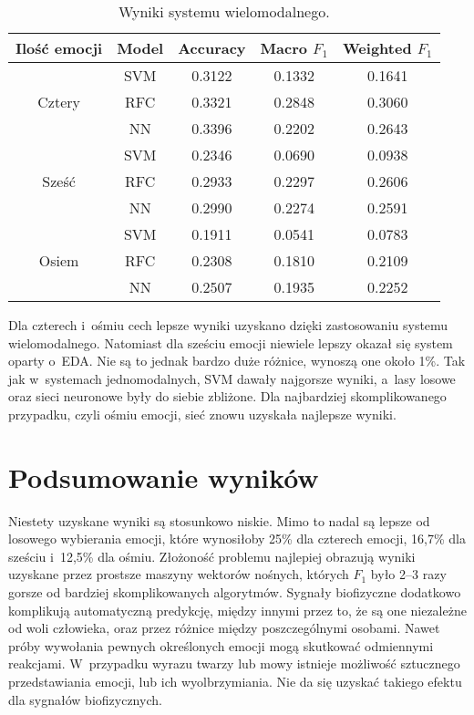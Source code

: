 \begin{table}[h]
    \centering
    \begin{tabular}{||c||c||c|c|c||}
        \hline
        Ilość emocji & Model & Accuracy & Macro \(F_{1}\) & Weighted \(F_{1}\) \\ [0.5ex]
        \hline\hline
        \multirow{3}{4em}{Cztery} & SVM & 0.3122 & 0.1332 & 0.1641 \\
        \cline{2-5}
        & RFC & 0.3321 & 0.2848 & 0.3060 \\
        \cline{2-5}
        & NN & 0.3396 & 0.2202 & 0.2643 \\
        \hline\hline
        \multirow{3}{4em}{Sześć} & SVM & 0.2346 & 0.0690 & 0.0938 \\
        \cline{2-5}
        & RFC & 0.2933 & 0.2297 & 0.2606 \\
        \cline{2-5}
        & NN & 0.2990 & 0.2274 & 0.2591 \\
        \hline\hline
        \multirow{3}{4em}{Osiem} & SVM & 0.1911 & 0.0541 & 0.0783 \\
        \cline{2-5}
        & RFC & 0.2308 & 0.1810 & 0.2109 \\
        \cline{2-5}
        & NN & 0.2507 & 0.1935 & 0.2252 \\
        \hline
    \end{tabular}
    \caption{Wyniki systemu wielomodalnego.}
    \label{tab:table-combined}
\end{table}

Dla czterech i~ośmiu cech lepsze wyniki uzyskano dzięki zastosowaniu systemu wielomodalnego.
Natomiast dla sześciu emocji niewiele lepszy okazał się system oparty o~EDA\@.
Nie są to jednak bardzo duże różnice, wynoszą one około 1\%.
Tak jak w~systemach jednomodalnych, SVM dawały najgorsze wyniki, a~lasy losowe oraz sieci neuronowe były do siebie zbliżone.
Dla najbardziej skomplikowanego przypadku, czyli ośmiu emocji, sieć znowu uzyskała najlepsze wyniki.

\section{Podsumowanie wyników}\label{sec:podsumowanie-wynikow}

Niestety uzyskane wyniki są stosunkowo niskie.
Mimo to nadal są lepsze od losowego wybierania emocji, które wynosiłoby 25\% dla czterech emocji, 16,7\% dla sześciu i~12,5\% dla ośmiu.
Złożoność problemu najlepiej obrazują wyniki uzyskane przez prostsze maszyny wektorów nośnych, których \(F_{1}\) było 2–3 razy gorsze od bardziej skomplikowanych algorytmów.
Sygnały biofizyczne dodatkowo komplikują automatyczną predykcję, między innymi przez to, że są one niezależne od woli człowieka, oraz przez różnice między poszczególnymi osobami.
Nawet próby wywołania pewnych określonych emocji mogą skutkować odmiennymi reakcjami.
W~przypadku wyrazu twarzy lub mowy istnieje możliwość sztucznego przedstawiania emocji, lub ich wyolbrzymiania.
Nie da się uzyskać takiego efektu dla sygnałów biofizycznych.

